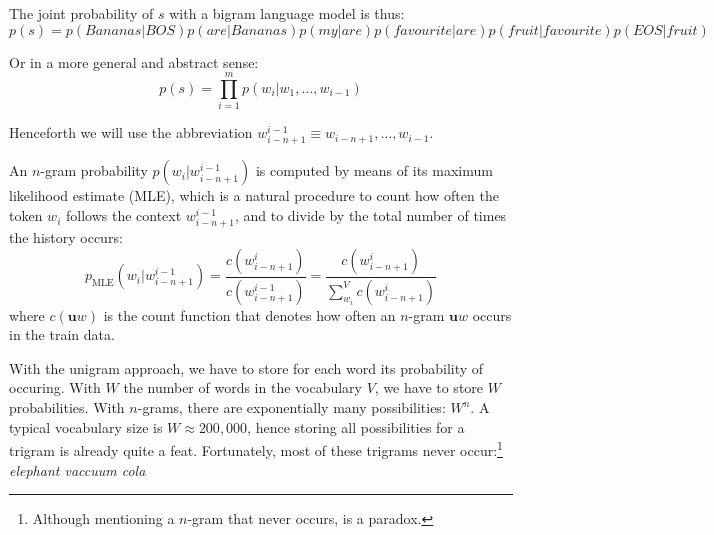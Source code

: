 The joint probability of $s$ with a bigram language model is thus:
\[ p(s) = p(\mathit{Bananas}|\mathit{BOS})p(\mathit{are}|\mathit{Bananas})p(\mathit{my}|\mathit{are})p(\mathit{favourite}|\mathit{are})p(\mathit{fruit}|\mathit{favourite})p(\mathit{EOS}|\mathit{fruit})\]

Or in a more general and abstract sense:
\[ p(s) = \prod_{i=1}^mp(w_i|w_1,\ldots,w_{i-1}) \]

Henceforth we will use the abbreviation $w_{i-n+1}^{i-1} \equiv w_{i-n+1},\ldots,w_{i-1}$.

An $n$-gram probability $p(w_i|w_{i-n+1}^{i-1})$ is computed by means of its maximum likelihood estimate (MLE), which is a natural procedure to count how often the token $w_i$ follows the context $w_{i-n+1}^{i-1}$, and to divide by the total number of times the history occurs:
\begin{equation} p_{\operatorname{MLE}}\left(w_i|w_{i-n+1}^{i-1}\right) = \frac{c\left(w_{i-n+1}^i\right)}{c\left(w_{i-n+1}^{i-1}\right)} = \frac{c\left(w_{i-n+1}^{i}\right)}{\sum_{w_i}^{V}c\left(w_{i-n+1}^{i}\right)}\label{eq:pmle}
\end{equation}
where $c(\mathbf{u}w)$ is the count function that denotes how often an $n$-gram $\mathbf{u}w$ occurs in the train data.

With the unigram approach, we have to store for each word its probability of occuring. With $W$ the number of words in the vocabulary $V$, we have to store $W$ probabilities. With $n$-grams, there are exponentially many possibilities: $W^n$. A typical vocabulary size is $W\approx 200,000$, hence storing all possibilities for a trigram is already quite a feat. Fortunately, most of these trigrams never occur:\footnote{Although mentioning a $n$-gram that never occurs, is a paradox.} \emph{elephant vaccuum cola}





